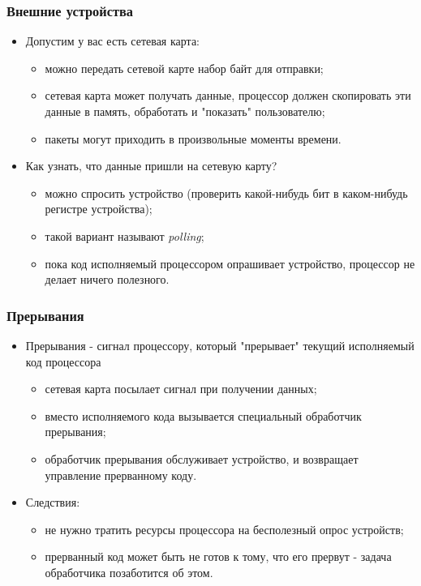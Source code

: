 \begin{frame}
\frametitle{Внешние устройства}
\begin{itemize}
  \item Допустим у вас есть сетевая карта:
  \begin{itemize}
    \item можно передать сетевой карте набор байт для отправки;
    \item сетевая карта может получать данные, процессор должен скопировать эти
    данные в память, обработать и "показать" пользователю;
    \item пакеты могут приходить в произвольные моменты времени.
  \end{itemize}
  \item Как узнать, что данные пришли на сетевую карту?
  \begin{itemize}
    \item можно спросить устройство (проверить какой-нибудь бит в каком-нибудь
    регистре устройства);
    \item такой вариант называют \emph{polling};
    \item пока код исполняемый процессором опрашивает устройство, процессор не
    делает ничего полезного.
  \end{itemize}
\end{itemize}
\end{frame}

\begin{frame}
\frametitle{Прерывания}
\begin{itemize}
  \item Прерывания - сигнал процессору, который "прерывает" текущий исполняемый
  код процессора
  \begin{itemize}
    \item сетевая карта посылает сигнал при получении данных;
    \item вместо исполняемого кода вызывается специальный обработчик прерывания;
    \item обработчик прерывания обслуживает устройство, и возвращает управление
    прерванному коду.
  \end{itemize}
  \item Следствия:
  \begin{itemize}
    \item не нужно тратить ресурсы процессора на бесполезный опрос устройств;
    \item прерванный код может быть не готов к тому, что его прервут - задача
    обработчика позаботится об этом.
  \end{itemize}
\end{itemize}
\end{frame}

